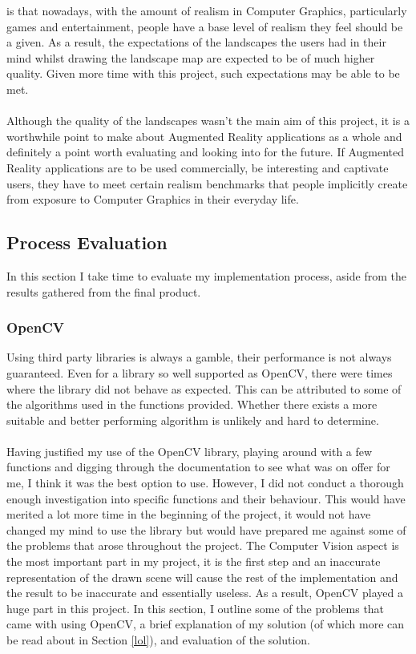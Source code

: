 \documentclass[11pt]{article}
\begin{document}
is that nowadays, with the amount of realism in Computer Graphics,
particularly games and entertainment, people have a base level of
realism they feel should be a given. As a result, the expectations
of the landscapes the users had in their mind whilst drawing the 
landscape map are expected to be of much higher quality. Given more time
with this project, such expectations may be able to be met. \\
\\
Although the quality of the landscapes wasn't the main
aim of this project, it is a worthwhile point to make about Augmented
Reality applications as a whole and definitely a point worth
evaluating and looking into for the future. If Augmented
Reality applications are to be used commercially, be
interesting and captivate users, they have to meet certain realism 
benchmarks that people implicitly create from exposure to 
Computer Graphics in their everyday life.

\subsection{Process Evaluation}
In this section I take time to evaluate my implementation process, aside
from the results gathered from the final product.

\subsubsection{OpenCV}
Using third party libraries is always a gamble, their performance is not
always guaranteed. Even for a library so well supported as OpenCV, there 
were times where the library did not behave as expected. This can be 
attributed to some of the algorithms used in the functions provided. 
Whether there exists a more suitable and better performing algorithm is
unlikely and hard to determine.\\
\\
Having justified my use of the OpenCV library, playing around with a 
few functions and digging through the documentation to see what was
on offer for me, I think it was the best option to use. 
However, I did not conduct a thorough enough investigation into specific
functions and their behaviour. This would have merited a lot more time in 
the beginning of the project, it would not have changed my mind to  use
the library but would have prepared me against some of the problems that 
arose throughout the project. The Computer Vision aspect is the most
important part in my project, it is the first step and an inaccurate
representation of the drawn scene will cause the rest of the 
implementation and the result to be inaccurate and essentially useless. As
a result, OpenCV played a huge part in this project. 
In this section, I outline some of the
problems that came with using OpenCV, a brief explanation of my solution
(of which more can be read about in Section \ref{lol}), and evaluation of
the solution. 
\end{document}
